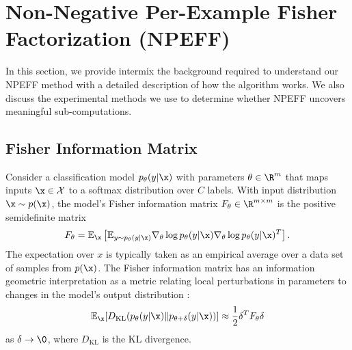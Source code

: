 \documentclass[dvipsnames]{article}
\begin{document}


\section{Non-Negative Per-Example Fisher Factorization (NPEFF)}

In this section, we provide intermix the background required to understand our NPEFF method with a detailed description of how the algorithm works.
We also discuss the experimental methods we use to determine whether NPEFF uncovers meaningful sub-computations.

\subsection{Fisher Information Matrix}
Consider a classification model $p_\theta(y|\x)$ with parameters $\theta \in \R^m$ that maps inputs $\x\in\mathcal X$ to a softmax distribution over $C$ labels.
With input distribution $\x \sim p(\x)$, the model's Fisher information matrix $F_\theta \in \R^{m\times m}$ is the positive semidefinite matrix
\begin{equation}\label{eq:ds_fisher}
    F_\theta = \mathbb E_\x \left[\mathbb E_{y\sim p_\theta(y|\x)} \nabla_\theta \log p_\theta(y|\x) \nabla_\theta \log p_\theta(y|\x)^T \right].
\end{equation}
The expectation over $x$ is typically taken as an empirical average over a data set of samples from $p(\x)$.
The Fisher information matrix has an information geometric interpretation as a metric relating local perturbations in parameters to changes in the model's output distribution \citep{amari2016information}:
\begin{equation}\label{eq:ds_fisher_info_geom}
    \mathbb E_\x [D_\mathrm{KL}(p_\theta(y|\x) \| p_{\theta+\delta}(y|\x))] \approx \frac12 \delta^T F_\theta \delta
\end{equation}
as $\delta \to \0$, where $D_\mathrm{KL}$ is the KL divergence.
\end{document}
